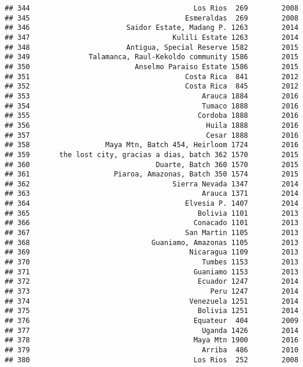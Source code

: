 \documentclass[
]{article}
\begin{document}
\begin{verbatim}
## 344                                       Los Rios  269        2008
## 345                                     Esmeraldas  269        2008
## 346                       Saidor Estate, Madang P. 1263        2014
## 347                                  Kulili Estate 1263        2014
## 348                       Antigua, Special Reserve 1582        2015
## 349              Talamanca, Raul-Kekoldo community 1586        2015
## 350                         Anselmo Paraiso Estate 1586        2015
## 351                                     Costa Rica  841        2012
## 352                                     Costa Rica  845        2012
## 353                                         Arauca 1884        2016
## 354                                         Tumaco 1888        2016
## 355                                        Cordoba 1888        2016
## 356                                          Huila 1888        2016
## 357                                          Cesar 1888        2016
## 358                  Maya Mtn, Batch 454, Heirloom 1724        2016
## 359       the lost city, gracias a dias, batch 362 1570        2015
## 360                              Duarte, Batch 360 1570        2015
## 361                    Piaroa, Amazonas, Batch 350 1574        2015
## 362                                  Sierra Nevada 1347        2014
## 363                                         Arauca 1371        2014
## 364                                     Elvesia P. 1407        2014
## 365                                        Bolivia 1101        2013
## 366                                       Conacado 1101        2013
## 367                                     San Martin 1105        2013
## 368                             Guaniamo, Amazonas 1105        2013
## 369                                      Nicaragua 1109        2013
## 370                                         Tumbes 1153        2013
## 371                                       Guaniamo 1153        2013
## 372                                        Ecuador 1247        2014
## 373                                           Peru 1247        2014
## 374                                      Venezuela 1251        2014
## 375                                        Bolivia 1251        2014
## 376                                       Equateur  404        2009
## 377                                         Uganda 1426        2014
## 378                                       Maya Mtn 1900        2016
## 379                                         Arriba  486        2010
## 380                                       Los Rios  252        2008

\end{verbatim}
\end{document}
